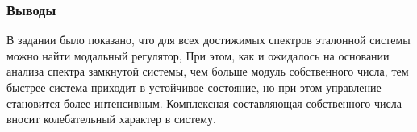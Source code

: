 \subsubsection{Выводы}
В задании было показано, что для всех достижимых спектров эталонной системы можно найти модальный регулятор,
При этом, как и ожидалось на основании анализа спектра замкнутой системы, чем больше модуль
собственного числа, тем быстрее система приходит в устойчивое состояние, но при этом управление становится более интенсивным. 
Комплексная составляющая собственного числа вносит колебательный характер в систему. 